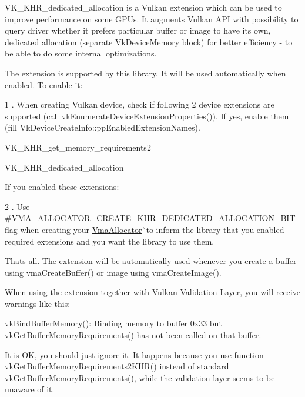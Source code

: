 VK\+\_\+\+KHR\+\_\+dedicated\+\_\+allocation is a Vulkan extension which can be used to improve performance on some GPUs. It augments Vulkan API with possibility to query driver whether it prefers particular buffer or image to have its own, dedicated allocation (separate {\ttfamily Vk\+Device\+Memory} block) for better efficiency -\/ to be able to do some internal optimizations.

The extension is supported by this library. It will be used automatically when enabled. To enable it\+:

1 . When creating Vulkan device, check if following 2 device extensions are supported (call {\ttfamily vk\+Enumerate\+Device\+Extension\+Properties()}). If yes, enable them (fill {\ttfamily Vk\+Device\+Create\+Info\+::pp\+Enabled\+Extension\+Names}).


\begin{DoxyItemize}
\item VK\+\_\+\+KHR\+\_\+get\+\_\+memory\+\_\+requirements2
\item VK\+\_\+\+KHR\+\_\+dedicated\+\_\+allocation
\end{DoxyItemize}

If you enabled these extensions\+:

2 . Use \#\+VMA\+\_\+\+ALLOCATOR\+\_\+\+CREATE\+\_\+\+KHR\+\_\+\+DEDICATED\+\_\+\+ALLOCATION\+\_\+\+BIT flag when creating your \mbox{\hyperlink{structVmaAllocator}{Vma\+Allocator}}\`{}to inform the library that you enabled required extensions and you want the library to use them.


\begin{DoxyCode}{0}
\DoxyCodeLine{}

\end{DoxyCode}


That\textquotesingle{}s all. The extension will be automatically used whenever you create a buffer using vma\+Create\+Buffer() or image using vma\+Create\+Image().

When using the extension together with Vulkan Validation Layer, you will receive warnings like this\+: \begin{DoxyVerb}vkBindBufferMemory(): Binding memory to buffer 0x33 but vkGetBufferMemoryRequirements() has not been called on that buffer.
\end{DoxyVerb}
 It is OK, you should just ignore it. It happens because you use function {\ttfamily vk\+Get\+Buffer\+Memory\+Requirements2\+KHR()} instead of standard {\ttfamily vk\+Get\+Buffer\+Memory\+Requirements()}, while the validation layer seems to be unaware of it.

